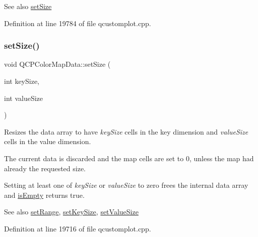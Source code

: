 \begin{DoxySeeAlso}{See also}
\hyperlink{class_q_c_p_color_map_data_a0d9ff35c299d0478b682bfbcdd9c097e}{set\+Size} 
\end{DoxySeeAlso}


Definition at line 19784 of file qcustomplot.\+cpp.

\mbox{\label{class_q_c_p_color_map_data_a0d9ff35c299d0478b682bfbcdd9c097e}} 
\subsubsection{\texorpdfstring{set\+Size()}{setSize()}}
{\footnotesize\ttfamily void Q\+C\+P\+Color\+Map\+Data\+::set\+Size (\begin{DoxyParamCaption}\item[{int}]{key\+Size,  }\item[{int}]{value\+Size }\end{DoxyParamCaption})}

Resizes the data array to have {\itshape key\+Size} cells in the key dimension and {\itshape value\+Size} cells in the value dimension.

The current data is discarded and the map cells are set to 0, unless the map had already the requested size.

Setting at least one of {\itshape key\+Size} or {\itshape value\+Size} to zero frees the internal data array and \hyperlink{class_q_c_p_color_map_data_aea88cc75a76ca571acf29b2ba8ac970d}{is\+Empty} returns true.

\begin{DoxySeeAlso}{See also}
\hyperlink{class_q_c_p_color_map_data_aad9c1c7c703c1339489fc730517c83d4}{set\+Range}, \hyperlink{class_q_c_p_color_map_data_ac7ef70e383aface34b44dbde49234b6b}{set\+Key\+Size}, \hyperlink{class_q_c_p_color_map_data_a0893c9e3914513048b45e3429ffd16f2}{set\+Value\+Size} 
\end{DoxySeeAlso}


Definition at line 19716 of file qcustomplot.\+cpp.

\mbox{\label{class_q_c_p_color_map_data_ada1b2680ba96a5f4175b6d341cf75d23}} 
